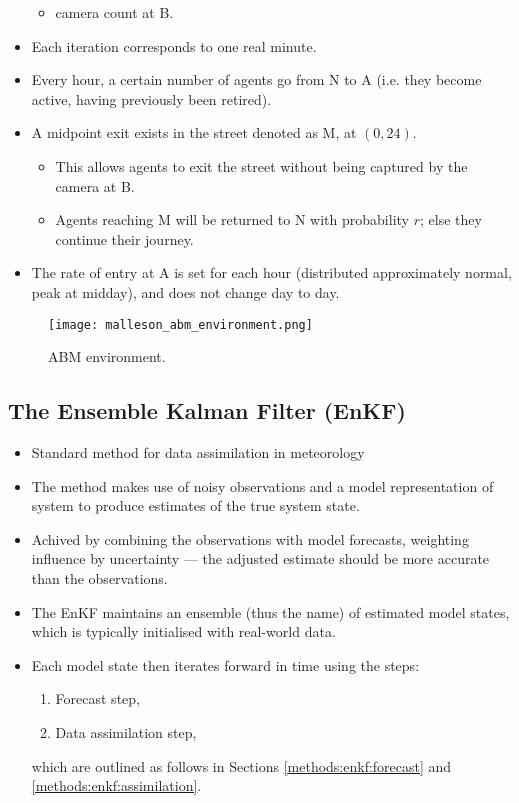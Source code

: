 \begin{itemize}
\begin{itemize}
        \item camera count at B.
    \end{itemize}
    \item Each iteration corresponds to one real minute.
    \item Every hour, a certain number of agents go from N to A (i.e. they become active, having previously been retired).
    \item A midpoint exit exists in the street denoted as M, at $\left( 0, 24 \right)$.
    \begin{itemize}
        \item This allows agents to exit the street without being captured by the camera at B.
        \item Agents reaching M will be returned to N with probability $r$; else they continue their journey.
    \end{itemize}
    \item The rate of entry at A is set for each hour (distributed approximately normal, peak at midday), and does not change day to day.
\end{itemize}

\begin{figure}
  \centering
    \texttt{[image: malleson\_abm\_environment.png]}
  \caption{ABM environment.}
  \label{fig:malleson_abm_environment}
\end{figure}

\subsection{The Ensemble Kalman Filter (EnKF)}
\label{malleson:methods:enkf}

\begin{itemize}
    \item Standard method for data assimilation in meteorology
    \item The method makes use of noisy observations and a model representation of system to produce estimates of the true system state.
    \item Achived by combining the observations with model forecasts, weighting influence by uncertainty --- the adjusted estimate should be more accurate than the observations.
    \item The EnKF maintains an ensemble (thus the name) of estimated model states, which is typically initialised with real-world data.
    \item Each model state then iterates forward in time using the steps:
    \begin{enumerate}
        \item Forecast step,
        \item Data assimilation step,
    \end{enumerate}
    which are outlined as follows in Sections \ref{methods:enkf:forecast} and \ref{methods:enkf:assimilation}.
\end{itemize}

